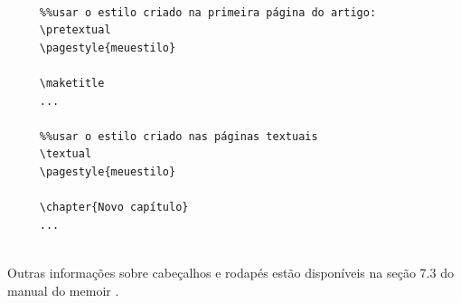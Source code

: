 \begin{verbatim}
   
     %%usar o estilo criado na primeira página do artigo:
     \pretextual
     \pagestyle{meuestilo}
     
     \maketitle
     ...
     
     %%usar o estilo criado nas páginas textuais
     \textual
     \pagestyle{meuestilo}
     
     \chapter{Novo capítulo}
     ...
     
\end{verbatim}

Outras informações sobre cabeçalhos e rodapés estão disponíveis na seção 7.3 do
manual do \textsf{memoir} \cite{memoir}.

